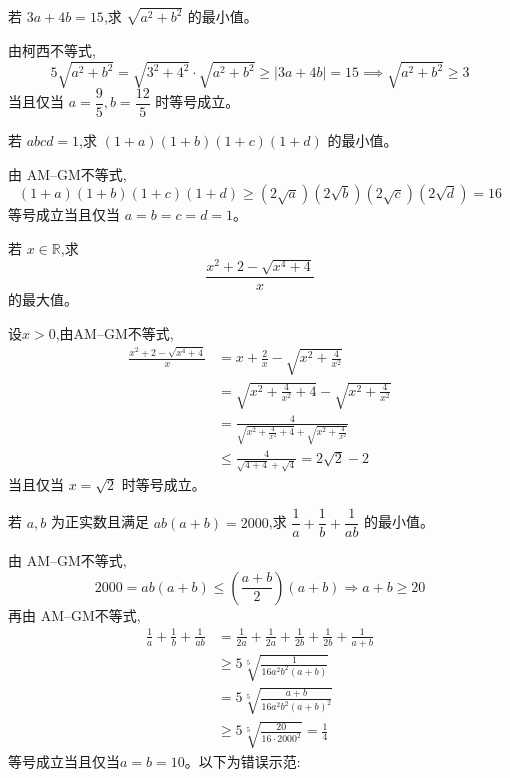 \begin{questions}
    \question 若 $3a+4b=15$,求 $\sqrt{a^2+b^2}$ 的最小值。
    \begin{solution}
        由柯西不等式,
        \[
        5\sqrt{a^2+b^2} = \sqrt{3^2+4^2}\cdot\sqrt{a^2+b^2} \ge |3a+4b| = 15 \implies \sqrt{a^2+b^2} \ge 3
        \]
        当且仅当 $a=\dfrac{9}{5},b=\dfrac{12}{5}$ 时等号成立。
    \end{solution}

    \question 若 $abcd=1$,求 $(1+a)(1+b)(1+c)(1+d)$ 的最小值。
    \begin{solution}
        由 AM–GM不等式,
        \[
        (1+a)(1+b)(1+c)(1+d) \ge (2\sqrt{a})(2\sqrt{b})(2\sqrt{c})(2\sqrt{d}) =16
        \]
        等号成立当且仅当 $a=b=c=d=1$。
    \end{solution}

    \question 若 $x\in \mathbb{R}$,求 
    \[
    \frac{x^2+2-\sqrt{x^4+4}}{x}
    \] 
    的最大值。
    \begin{solution}
        设$x>0$,由AM–GM不等式,
        \begin{align*}
        \frac{x^2+2-\sqrt{x^4+4}}{x} 
        &= x+\frac{2}{x}-\sqrt{x^2+\frac{4}{x^2}}\\
        &= \sqrt{x^2+\frac{4}{x^2}+4}-\sqrt{x^2+\frac{4}{x^2}}\\
        &=\frac{4}{\sqrt{x^2+\frac{4}{x^2}+4}+\sqrt{x^2+\frac{4}{x^2}}}\\
        &\le \frac{4}{\sqrt{4+4}+\sqrt{4}} = 2\sqrt{2}-2
        \end{align*}
        当且仅当 $x=\sqrt{2}$ 时等号成立。
    \end{solution}

    \question 若 $a,b$ 为正实数且满足 $ab(a+b)=2000$,求 $\dfrac{1}{a} + \dfrac{1}{b} + \dfrac{1}{ab}$ 的最小值。
    \begin{solution}
        由 AM–GM不等式,
        \[
        2000=ab(a+b)\le \left(\frac{a+b}{2}\right)(a+b) \Rightarrow a+b \ge 20
        \]
        再由 AM–GM不等式,
        \begin{align*}
        \frac{1}{a} + \frac{1}{b} + \frac{1}{ab} 
        &= \frac{1}{2a}+\frac{1}{2a}+\frac{1}{2b}+\frac{1}{2b}+\frac{1}{a+b} \\
        &\ge 5\sqrt[5]{\frac{1}{16a^2b^2(a+b)}} \\
        &= 5 \sqrt[5]{\frac{a+b}{16a^2b^2(a+b)^2}} \\
        &\ge 5 \sqrt[5]{\frac{20}{16\cdot 2000^2}} = \frac{1}{4}
        \end{align*}
        等号成立当且仅当$a=b=10$。以下为错误示范:


\end{solution}
\end{questions}
